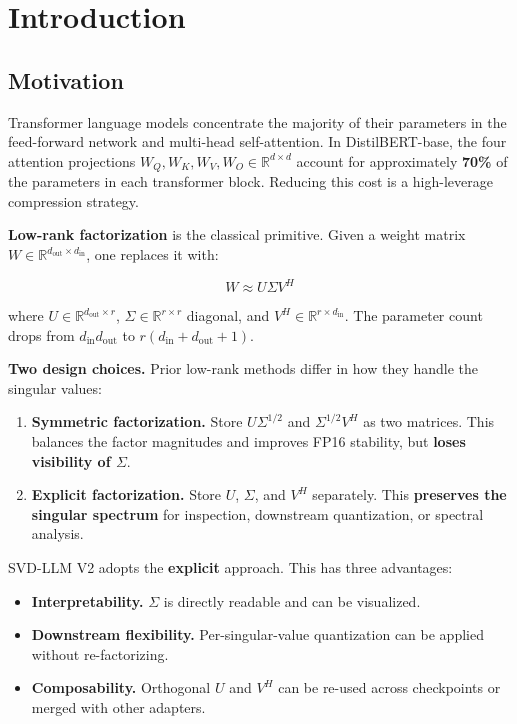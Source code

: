 
\section{Introduction}

\subsection{Motivation}

Transformer language models concentrate the majority of their parameters in 
the feed-forward network and multi-head self-attention. In DistilBERT-base, 
the four attention projections $W_Q, W_K, W_V, W_O \in \mathbb{R}^{d \times d}$ 
account for approximately \textbf{70\%} of the parameters in each transformer 
block. Reducing this cost is a high-leverage compression strategy.

\textbf{Low-rank factorization} is the classical primitive. Given a weight matrix 
$W \in \mathbb{R}^{d_\text{out} \times d_\text{in}}$, one replaces it with:

\[
W \approx U \Sigma V^H
\tag{1.1}
\]

where $U \in \mathbb{R}^{d_\text{out} \times r}$, $\Sigma \in \mathbb{R}^{r \times r}$ 
diagonal, and $V^H \in \mathbb{R}^{r \times d_\text{in}}$. The parameter count 
drops from $d_\text{in} d_\text{out}$ to $r(d_\text{in} + d_\text{out} + 1)$.

\textbf{Two design choices.} Prior low-rank methods differ in how they handle the 
singular values:

\begin{enumerate}
\item \textbf{Symmetric factorization.} Store $U \Sigma^{1/2}$ and $\Sigma^{1/2} V^H$
  as two matrices. This balances the factor magnitudes and improves FP16
  stability, but \textbf{loses visibility of $\Sigma$}.
\item \textbf{Explicit factorization.} Store $U$, $\Sigma$, and $V^H$ separately.
  This \textbf{preserves the singular spectrum} for inspection, downstream
  quantization, or spectral analysis.

\end{enumerate}
SVD-LLM V2 adopts the \textbf{explicit} approach. This has three advantages:

\begin{itemize}
\item \textbf{Interpretability.} $\Sigma$ is directly readable and can be visualized.
\item \textbf{Downstream flexibility.} Per-singular-value quantization can be applied
  without re-factorizing.
\item \textbf{Composability.} Orthogonal $U$ and $V^H$ can be re-used across
  checkpoints or merged with other adapters.

\end{itemize}
